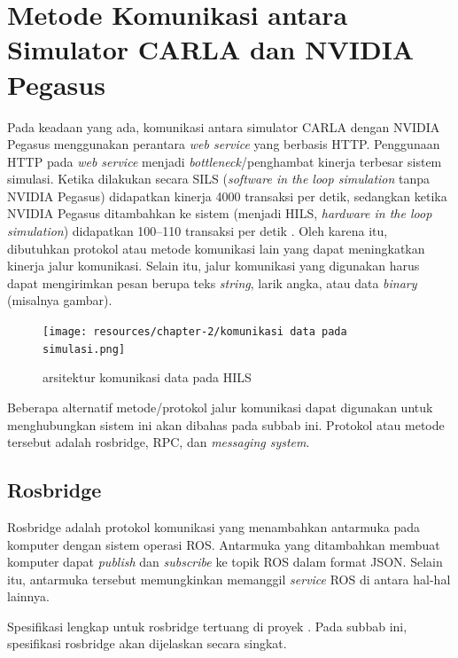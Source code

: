 \section{Metode Komunikasi antara Simulator CARLA dan NVI\-DI\-A Pegasus}

Pada keadaan yang ada, komunikasi antara simulator CARLA dengan NVIDIA Pegasus
menggunakan perantara \textit{web service} yang berbasis HTTP. Penggunaan HTTP
pada \textit{web service} menjadi \textit{bottleneck}/penghambat kinerja
terbesar sistem simulasi. Ketika dilakukan secara SILS (\textit{software in the
    loop simulation} tanpa NVIDIA Pegasus) didapatkan kinerja 4000 transaksi per
detik, sedangkan ketika NVIDIA Pegasus ditambahkan ke sistem (menjadi HILS,
\textit{hardware in the loop simulation}) didapatkan 100--110 transaksi per
detik \parencite{trilaksono_laporanRispro}. Oleh karena itu, dibutuhkan protokol
atau metode komunikasi lain yang dapat meningkatkan kinerja jalur komunikasi.
Selain itu, jalur komunikasi yang digunakan harus dapat mengirimkan pesan berupa
teks \textit{string}, larik angka, atau data \textit{binary} (misalnya gambar).

\begin{figure}
    \begin{center}
        \texttt{[image: resources/chapter-2/komunikasi
            data pada simulasi.png]}
        \caption{arsitektur komunikasi data pada HILS \parencite{trilaksono_laporanRispro}}
    \end{center}
\end{figure}

Beberapa alternatif metode/protokol jalur komunikasi dapat digunakan untuk
meng\-hu\-bung\-kan sistem ini akan dibahas pada subbab ini. Protokol atau
metode tersebut adalah rosbridge, RPC, dan \textit{messaging system}.

\subsection{Rosbridge}

Rosbridge adalah protokol komunikasi yang menambahkan antarmuka pada komputer
dengan sistem operasi ROS. Antarmuka yang ditambahkan membuat komputer dapat
\textit{publish} dan \textit{subscribe} ke topik ROS dalam format JSON. Selain
itu, antarmuka tersebut memungkinkan memanggil \textit{service} ROS di antara
hal-hal lainnya.

Spesifikasi lengkap untuk rosbridge tertuang di proyek \parencite{ros_bridge}.
Pada subbab ini, spesifikasi rosbridge akan dijelaskan secara singkat.

